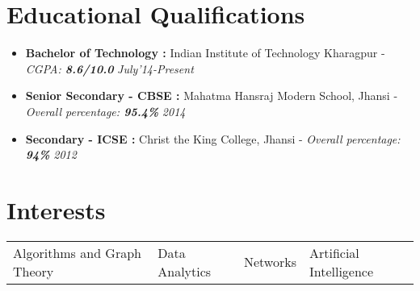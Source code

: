 \documentclass[11pt,a4paper]{moderncv}
\newcommand{\education}[5]{
\item[] \textbf{\large{#1 :}} #2 - \emph{#3: \textbf{#4}} \hfill\textit{#5}
}
\begin{document}
\maketitle
\vspace{-1cm}
\section*{Educational Qualifications}
\begin{itemize}
  \setlength\itemsep{0.2cm}
  \education{Bachelor of Technology}{Indian Institute of Technology Kharagpur}{CGPA}{8.6/10.0}{July'14-Present}
  \education{Senior Secondary - CBSE}{Mahatma Hansraj Modern School, Jhansi}{Overall percentage}{95.4\%}{2014}
  \education{Secondary - ICSE}{Christ the King College, Jhansi}{Overall percentage}{94\%}{2012}
\end{itemize}

\section*{Interests}
\begin{tabular}{L{6.5cm} L{4cm} L{3.4cm} l}
  Algorithms and Graph Theory & Data Analytics & Networks &
  Artificial Intelligence \\
\end{tabular}

\vspace{-0.1cm}
\end{document}
